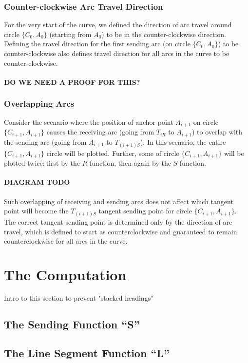 \documentclass{article}
\begin{document}
\subsubsection{Counter-clockwise Arc Travel Direction}
For the very start of the curve, we defined the direction of arc travel around circle $\{C_0, A_0\}$ (starting from $A_0$) to be in the counter-clockwise direction.
Defining the travel direction for the first sending arc (on circle $\{C_0, A_0\}$) to be counter-clockwise also defines travel direction for all arcs in the curve to be counter-clockwise.\\ \\

\textbf{DO WE NEED A PROOF FOR THIS?} \\

\subsubsection{Overlapping Arcs}
Consider the scenario where the position of anchor point $A_{i+1}$ on circle $\{C_{i+1}, A_{i+1}\}$ causes the receiving arc (going from $T_{iR}$ to $A_{i+1}$) to overlap with the sending arc (going from $A_{i+1}$ to $T_{(i+1)S}$). In this scenario, the entire $\{C_{i+1}, A_{i+1}\}$ circle will be plotted. Further, some of circle $\{C_{i+1}, A_{i+1}\}$ will be plotted twice: first by the $R$ function, then again by the $S$ function.\\ \\
\textbf{DIAGRAM TODO}\\ \\
Such overlapping of receiving and sending arcs does not affect which tangent point will become the $T_{(i+1)S}$ tangent sending point for circle $\{C_{i+1}, A_{i+1}\}$. The correct tangent sending point is determined only by the direction of arc travel, which is defined to start as counterclockwise and guaranteed to remain counterclockwise for all arcs in the curve.

\section{The Computation}
Intro to this section to prevent "stacked headings"
\subsection{The Sending Function “S”}

\subsection{The Line Segment Function “L”}
\end{document}

